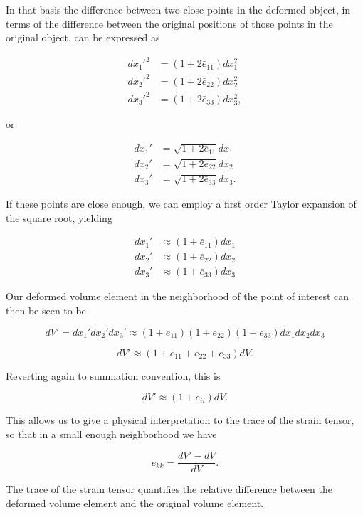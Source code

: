 In that basis the difference between two close points in the deformed object, in terms of the difference between the original positions of those points in the original object, can be expressed as

\begin{align}\label{eqn:continuumL2:270}
{dx_1'}^2 &= (1 + 2 \bar{e}_{11}) dx_1^2 \\
{dx_2'}^2 &= (1 + 2 \bar{e}_{22}) dx_2^2 \\
{dx_3'}^2 &= (1 + 2 \bar{e}_{33}) dx_3^2,
\end{align}

or

\begin{align}\label{eqn:continuumL2:280}
dx_1' &= \sqrt{1 + 2 \bar{e}_{11}} dx_1 \\
dx_2' &= \sqrt{1 + 2 \bar{e}_{22}} dx_2 \\
dx_3' &= \sqrt{1 + 2 \bar{e}_{33}} dx_3.
\end{align}

If these points are close enough, we can employ a first order Taylor expansion of the square root, yielding

\begin{align}\label{eqn:continuumL2:290}
dx_1' &\approx (1 + \bar{e}_{11}) dx_1 \\
dx_2' &\approx (1 + \bar{e}_{22}) dx_2 \\
dx_3' &\approx (1 + \bar{e}_{33}) dx_3
\end{align}

Our deformed volume element in the neighborhood of the point of interest can then be seen to be

\begin{equation}\label{eqn:continuumL2:310}
dV' =
dx_1'
dx_2'
dx_3'
\approx
(1 + e_{11})
(1 + e_{22})
(1 + e_{33})
dx_1 dx_2 dx_3
\end{equation}

\begin{equation}\label{eqn:continuumL2:330}
dV' \approx (1 + e_{11} +e_{22} +e_{33} ) dV.
\end{equation}

Reverting again to summation convention, this is

\begin{equation}\label{eqn:continuumL2:350}
dV' \approx ( 1 + e_{ii} ) dV.
\end{equation}

This allows us to give a physical interpretation to the trace of the strain tensor, so that in a small enough neighborhood we have

\begin{equation}\label{eqn:continuumElasticityReview:190}
e_{kk} = \frac{dV' - dV}{dV}.
\end{equation}

The trace of the strain tensor quantifies the relative difference between the deformed volume element and the original volume element.
